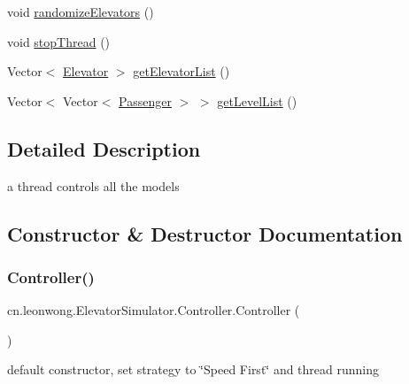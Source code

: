 \begin{DoxyCompactItemize}
\item 
void \hyperlink{classcn_1_1leonwong_1_1_elevator_simulator_1_1_controller_a3fcedb04b31288434dfc312af5f4e32c}{randomize\+Elevators} ()
\item 
void \hyperlink{classcn_1_1leonwong_1_1_elevator_simulator_1_1_controller_a9c5e5f2cccaf70952c8764d939defb32}{stop\+Thread} ()
\item 
Vector$<$ \hyperlink{classcn_1_1leonwong_1_1_elevator_simulator_1_1_model_1_1_elevator}{Elevator} $>$ \hyperlink{classcn_1_1leonwong_1_1_elevator_simulator_1_1_controller_ae0276c45413f15649723ce5cb91062eb}{get\+Elevator\+List} ()
\item 
Vector$<$ Vector$<$ \hyperlink{classcn_1_1leonwong_1_1_elevator_simulator_1_1_model_1_1_passenger}{Passenger} $>$ $>$ \hyperlink{classcn_1_1leonwong_1_1_elevator_simulator_1_1_controller_a0c5a39ff927a7dac0327f11792066dca}{get\+Level\+List} ()
\end{DoxyCompactItemize}


\subsection{Detailed Description}
a thread controls all the models 

\subsection{Constructor \& Destructor Documentation}
\mbox{\label{classcn_1_1leonwong_1_1_elevator_simulator_1_1_controller_aa06d5a3c850887389af3318b4b47c7a0}} 
\subsubsection{\texorpdfstring{Controller()}{Controller()}}
{\footnotesize\ttfamily cn.\+leonwong.\+Elevator\+Simulator.\+Controller.\+Controller (\begin{DoxyParamCaption}{ }\end{DoxyParamCaption})}

default constructor, set strategy to \char`\"{}\+Speed First\char`\"{} and thread running 


